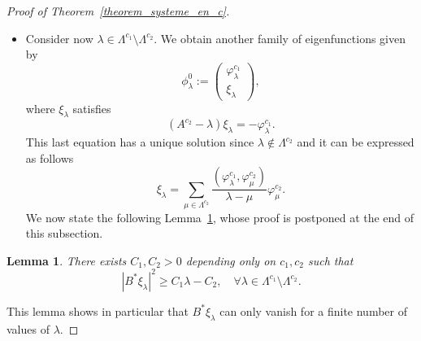 \documentclass[10pt]{amsart}
\newtheorem{lemm}[theo]{Lemma}\newtheorem{prop}[theo]{Proposition}\newtheorem{coro}[theo]{Corollary}\newtheorem{conj}[theo]{Conjecture}
\theoremstyle{definition}\newtheorem{defi}[theo]{Definition}\newtheorem{rema}[theo]{Remark}\newtheorem{exam}[theo]{Example}\newtheorem{exem}[theo]{Example}\newtheorem{nota}[theo]{Notation}
\newcommand{\fprop}[2]{\varphi^{#1}_{#2}}
\renewcommand{\cdot}{{\scriptstyle \bullet}}
\let\oldforall\forall
\renewcommand*{\forall}{\mathrel{\oldforall}}
\begin{document}
\begin{proof}[Proof of Theorem~\ref{theorem_systeme_en_c}]
\begin{itemize}
\begin{itemize}
\begin{itemize}
\item Assume now that $\beta_\lambda\neq 0$. In that case, $\lambda$ is geometrically simple but there exists a generalized eigenfunction $\phi_\lambda^1$ associated with $\phi_\lambda^0$ of the following form
\[
\phi_\lambda^1 := \frac{1}{\beta_\lambda}
\begin{pmatrix} \fprop{c_1}{\lambda} \\ \chi_\lambda
\end{pmatrix},
\]


where $\chi_\lambda$ is the unique solution of
\[
(A^{c_2} - \lambda) \chi_\lambda = \beta_\lambda \fprop{c_2}{\lambda} - \fprop{c_1}{\lambda},
\]
that satisfy $B^*\chi_\lambda=0$.

We can express $\chi_\lambda$ in the basis $\fprop{c_2}{\cdot}$ as follows
\[
\chi_\lambda=a_\lambda \fprop{c_2}{\lambda} - \sum_{\substack{\mu\in \Lambda^{c_2}\\ \mu \neq \lambda}} \frac{(\fprop{c_1}{\lambda},\fprop{c_2}{\mu})}{\lambda-\mu} \fprop{c_2}{\mu},
\]
with
\[
a_\lambda = \frac{1}{B^*\fprop{c_2}{\lambda}} \sum_{\substack{\mu\in \Lambda^{c_2}\\ \mu \neq \lambda}} \frac{(\fprop{c_1}{\lambda},\fprop{c_2}{\mu})}{\lambda-\mu} B^* \fprop{c_2}{\mu}.
\]
\end{itemize}
\end{itemize}
\item Consider now $\lambda\in \Lambda^{c_1}\setminus \Lambda^{c_2}$. We obtain another family of eigenfunctions given by
\begin{equation}\label{systeme_en_c_fp2}
\phi_\lambda^0 :=
\begin{pmatrix} \fprop{c_1}{\lambda} \\ \xi_\lambda
\end{pmatrix},
\end{equation}
where $\xi_\lambda$ satisfies
\[
(A^{c_2}-\lambda) \xi_\lambda = - \fprop{c_1}{\lambda}.
\]
This last equation has a unique solution since $\lambda\not\in \Lambda^{c_2}$ and it can be expressed as follows
\begin{equation}\label{def_xi_lambda}
\xi_\lambda = \sum_{\mu\in \Lambda^{c_2}} \frac{(\fprop{c_1}{\lambda},\fprop{c_2}{\mu})}{\lambda-\mu} \fprop{c_2}{\mu}.
\end{equation}
We now state the following Lemma~\ref{lemme_ABM}, whose proof is postponed at the end of this subsection.
\end{itemize}
\begin{lemm}\label{lemme_ABM}
There exists $C_1,C_2>0$ depending only on $c_1, c_2$ such that
\begin{equation}\label{ABM_xi_lambda}
|B^* \xi_\lambda|^2 \geq C_1 \lambda - C_2, \quad \forall \lambda\in \Lambda^{c_1}\setminus \Lambda^{c_2}.
\end{equation}
\end{lemm}
This lemma shows in particular that $B^* \xi_\lambda$ can only vanish for a finite number of values of $\lambda$.



\end{proof}
\end{document}
